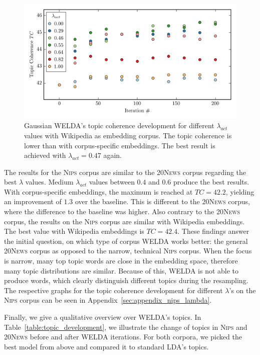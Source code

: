\documentclass[
        a4paper,
        titlepage,
        twoside,
        parskip
        ]{scrbook}
\theoremstyle{break}
\begin{document}
\begin{figure}
       \centering
       \includegraphics[width=\textwidth]{figures/welda_gaussian_lambda_200.png}
       \caption{Gaussian WELDA's topic coherence development for different $\lambda_{act}$ values with Wikipedia as embedding corpus. The topic coherence is lower than with corpus-specific embeddings. The best result is achieved with $\lambda_{act} = 0.47$ again.}
       \label{fig:welda_gaussian_lambda_200}
\end{figure}

The results for the \textsc{Nips} corpus are similar to the \textsc{20News} corpus regarding the best $\lambda$ values.
Medium $\lambda_{act}$ values between $0.4$ and $0.6$ produce the best results.
With corpus-specific embeddings, the maximum is reached at $TC = 42.2$, yielding an improvement of $1.3$ over the baseline.
This is different to the \textsc{20News} corpus, where the difference to the baseline was higher.
Also contrary to the \textsc{20News} corpus, the results on the \textsc{Nips} corpus are similar with Wikipedia embeddings.
The best value with Wikipedia embeddings is $TC = 42.4$.
These findings answer the initial question, on which type of corpus WELDA works better: the general \textsc{20News} corpus as opposed to the narrow, technical \textsc{Nips} corpus.
When the focus is narrow, many top topic words are close in the embedding space, therefore many topic distributions are similar.
Because of this, WELDA is not able to produce words, which clearly distinguish different topics during the resampling.
The respective graphs for the topic coherence development for different $\lambda$'s on the \textsc{Nips} corpus can be seen in Appendix~\ref{sec:appendix_nips_lambda}.

Finally, we give a qualitative overview over WELDA's topics.
In Table~\ref{table:topic_development}, we illustrate the change of topics in \textsc{Nips} and \textsc{20News} before and after WELDA iterations.
For both corpora, we picked the best model from above and compared it to standard LDA's topics.
\end{document}
